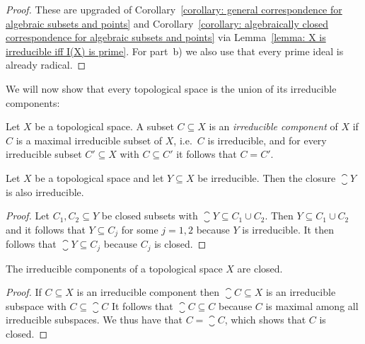 \begin{proof}
  These are upgraded of Corollary~\ref{corollary: general correspondence for algebraic subsets and points} and Corollary~\ref{corollary: algebraically closed correspondence for algebraic subsets and points} via Lemma~\ref{lemma: X is irreducible iff I(X) is prime}.
  For part~b) we also use that every prime ideal is already radical.
\end{proof}


\begin{fluff}
  We will now show that every topological space is the union of its irreducible components:
\end{fluff}


\begin{definition}
  Let $X$ be a topological space.
  A subset $C \subseteq X$ is an \emph{irreducible component} of $X$ if $C$ is a maximal irreducible subset of $X$, i.e.\ $C$ is irreducible, and for every irreducible subset $C' \subseteq X$ with $C \subseteq C'$ it follows that $C = C'$.
\end{definition}


\begin{lemma}
  Let $X$ be a topological space and let $Y \subseteq X$ be irreducible.
  Then the closure $\closure{Y}$ is also irreducible.
\end{lemma}


\begin{proof}
  Let $C_1, C_2 \subseteq Y$ be closed subsets with $\closure{Y} \subseteq C_1 \cup C_2$.
  Then $Y \subseteq C_1 \cup C_2$ and it follows that $Y \subseteq C_j$ for some $j = 1,2$ because $Y$ is irreducible.
  It then follows that $\closure{Y} \subseteq C_j$ because $C_j$ is closed.
\end{proof}


\begin{corollary}
  The irreducible components of a topological space $X$ are closed.
\end{corollary}


\begin{proof}
  If $C \subseteq X$ is an irreducible component then $\closure{C} \subseteq X$ is an irreducible subspace with $C \subseteq \closure{C}$
  It follows that $\closure{C} \subseteq C$ because $C$ is maximal among all irreducible subspaces.
  We thus have that $C = \closure{C}$, which shows that $C$ is closed.
\end{proof}


